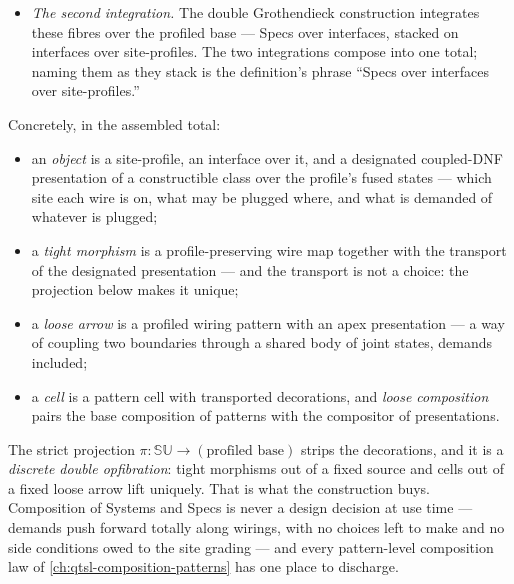 \begin{definition}
\begin{itemize}
interface, the decoration functor $\mathcal{D}$ assigns the
coupled-DNF presentations of constructible classes of belief
bodies over that interface's states. This clause compresses the
tower: a record is an observation history over a window
(\autoref{sec:su-records}); the record carrier over each window
is a compact Fell hyperspace in which records enter as graphs
(\autoref{sec:su-carrier}); a System denotes a belief ---
a lower semicontinuous functional on laws, its radial body a closed
set of laws (\autoref{sec:su-denotation}); the hyperspace of
bodies makes Systems singleton elements
(\autoref{sec:su-hyperspace}); a Spec denotes a constructible
class of bodies, a finite union of crescents closed under the
connectives (\autoref{sec:su-classes}); and classes are carried
window by window over the site, gluing as persistent families
(\autoref{sec:su-sheaf}). The fibre holds
\emph{presentations}, not bare classes, because composition
consumes presentations: the compositor is monotone in the
presentation order and does not descend to semantic classes
(\autoref{sec:su-composition}).
\item \emph{The second integration.} The double Grothendieck
construction integrates these fibres over the profiled base ---
Specs over interfaces, stacked on interfaces over site-profiles.
The two integrations compose into one total; naming them as they
stack is the definition's phrase ``Specs over interfaces over
site-profiles.''
\end{itemize}
Concretely, in the assembled total:
\begin{itemize}
\item an \emph{object} is a site-profile, an interface over it, and
a designated coupled-DNF presentation of a constructible class over
the profile's fused states --- which site each wire is on, what may
be plugged where, and what is demanded of whatever is plugged;
\item a \emph{tight morphism} is a profile-preserving wire map
together with the transport of the designated presentation --- and
the transport is not a choice: the projection below makes it
unique;
\item a \emph{loose arrow} is a profiled wiring pattern with an
apex presentation --- a way of coupling two boundaries through a
shared body of joint states, demands included;
\item a \emph{cell} is a pattern cell with transported decorations,
and \emph{loose composition} pairs the base composition of patterns
with the compositor of presentations.
\end{itemize}
The strict projection $\pi \colon \mathbb{SU} \to
(\text{profiled base})$ strips the decorations, and it is a
\emph{discrete double opfibration}: tight morphisms out of a fixed
source and cells out of a fixed loose arrow lift uniquely. That is
what the construction buys. Composition of Systems and Specs is
never a design decision at use time --- demands push forward
totally along wirings, with no choices left to make and no side
conditions owed to the site grading --- and every pattern-level
composition law of
\autoref{ch:qtsl-composition-patterns} has one place to
discharge.
\end{definition}

